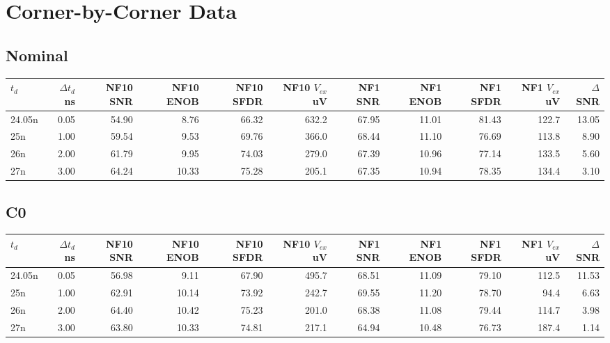 \documentclass[11pt]{article}
\begin{document}
\clearpage

\section*{Corner-by-Corner Data}

\subsection*{Nominal}
{\tiny\setlength{\tabcolsep}{2.5pt}
\begin{longtable}{lrrrrrrrrrr}
\toprule
$t_d$ & $\Delta t_d$ ns & NF10 SNR & NF10 ENOB & NF10 SFDR & NF10 $V_{ex}$ uV & NF1 SNR & NF1 ENOB & NF1 SFDR & NF1 $V_{ex}$ uV & $\Delta$SNR \\
\midrule
\endhead
24.05n & 0.05 & 54.90 & 8.76 & 66.32 & 632.2 & 67.95 & 11.01 & 81.43 & 122.7 & 13.05 \\
25n & 1.00 & 59.54 & 9.53 & 69.76 & 366.0 & 68.44 & 11.10 & 76.69 & 113.8 & 8.90 \\
26n & 2.00 & 61.79 & 9.95 & 74.03 & 279.0 & 67.39 & 10.96 & 77.14 & 133.5 & 5.60 \\
27n & 3.00 & 64.24 & 10.33 & 75.28 & 205.1 & 67.35 & 10.94 & 78.35 & 134.4 & 3.10 \\
\bottomrule
\end{longtable}
}

\subsection*{C0}
{\tiny\setlength{\tabcolsep}{2.5pt}
\begin{longtable}{lrrrrrrrrrr}
\toprule
$t_d$ & $\Delta t_d$ ns & NF10 SNR & NF10 ENOB & NF10 SFDR & NF10 $V_{ex}$ uV & NF1 SNR & NF1 ENOB & NF1 SFDR & NF1 $V_{ex}$ uV & $\Delta$SNR \\
\midrule
\endhead
24.05n & 0.05 & 56.98 & 9.11 & 67.90 & 495.7 & 68.51 & 11.09 & 79.10 & 112.5 & 11.53 \\
25n & 1.00 & 62.91 & 10.14 & 73.92 & 242.7 & 69.55 & 11.20 & 78.70 & 94.4 & 6.63 \\
26n & 2.00 & 64.40 & 10.42 & 75.23 & 201.0 & 68.38 & 11.08 & 79.44 & 114.7 & 3.98 \\
27n & 3.00 & 63.80 & 10.33 & 74.81 & 217.1 & 64.94 & 10.48 & 76.73 & 187.4 & 1.14 \\
\bottomrule
\end{longtable}
}
\end{document}
